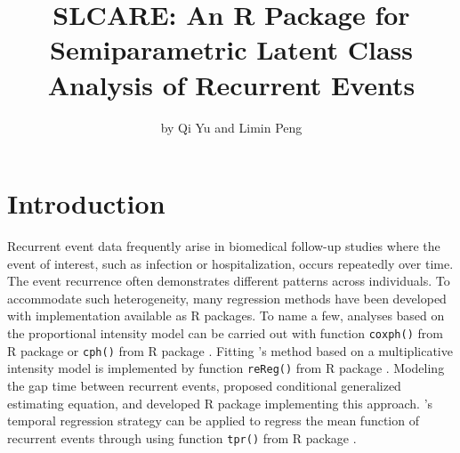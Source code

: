 \title{SLCARE: An R Package for Semiparametric Latent Class Analysis of Recurrent Events}


\author{by Qi Yu and Limin Peng}

\maketitle


\hypertarget{introduction}{%
\section{Introduction}\label{introduction}}

Recurrent event data frequently arise in biomedical follow-up studies where the event of interest, such as infection or hospitalization, occurs repeatedly over time. The event recurrence often demonstrates different patterns across individuals. To accommodate such heterogeneity, many regression methods have been developed with implementation available as R packages. To name a few, analyses based on the proportional intensity model \citep{andersen1982cox} can be carried out with function \texttt{coxph()} from R package  \citep{survival-package} or \texttt{cph()} from R package  \citep{rms}.
Fitting \citet{wang2001analyzing} 's method based on a multiplicative intensity model is implemented by function \texttt{reReg()} from R package  \citep{reReg}. Modeling the gap time between recurrent events, \citet{clement2009conditional} proposed conditional generalized estimating equation, and developed R package  implementing this approach.
\citet{fine2004temporal} 's temporal regression strategy can be applied to regress the mean function of recurrent events through using function \texttt{tpr()} from R package  \citep{yan2004estimating}.

